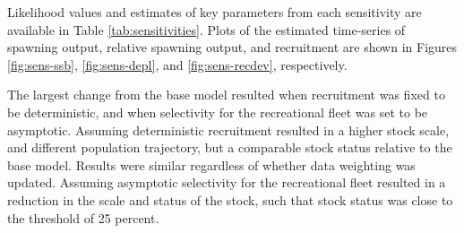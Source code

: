 \documentclass[11pt,
  english,
  a4paper,
]{article}
\begin{document}

Likelihood values and estimates of key parameters from each sensitivity are available in Table \ref{tab:sensitivities}. Plots of the estimated time-series of spawning output, relative spawning output, and recruitment are shown in Figures \ref{fig:sens-ssb}, \ref{fig:sens-depl}, and \ref{fig:sens-recdev}, respectively.

\leavevmode\tagmcend\tagstructend\par


The largest change from the base model resulted when recruitment was fixed to be deterministic, and when selectivity for the recreational fleet was set to be asymptotic. Assuming deterministic recruitment resulted in a higher stock scale, and different population trajectory, but a comparable stock status relative to the base model. Results were similar regardless of whether data weighting was updated. Assuming asymptotic selectivity for the recreational fleet resulted in a reduction in the scale and status of the stock, such that stock status was close to the threshold of 25 percent.

\leavevmode\tagmcend\tagstructend\par

\end{document}
